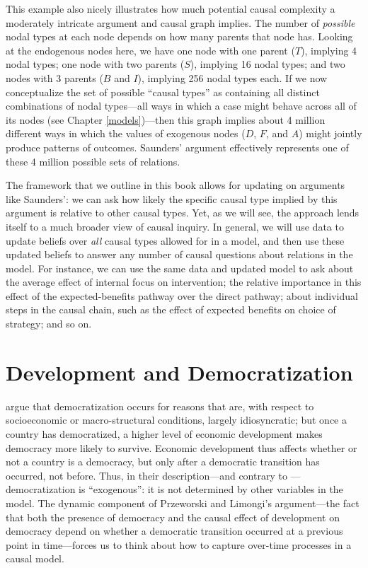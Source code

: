 \documentclass[
  12pt,
]{book}
\begin{document}
This example also nicely illustrates how much potential causal complexity a moderately intricate argument and causal graph implies. The number of \emph{possible} nodal types at each node depends on how many parents that node has. Looking at the endogenous nodes here, we have one node with one parent (\(T\)), implying 4 nodal types; one node with two parents (\(S\)), implying 16 nodal types; and two nodes with 3 parents (\(B\) and \(I\)), implying 256 nodal types each. If we now conceptualize the set of possible ``causal types'' as containing all distinct combinations of nodal types---all ways in which a case might behave across all of its nodes (see Chapter \ref{models})---then this graph implies about 4 million different ways in which the values of exogenous nodes (\(D\), \(F\), and \(A\)) might jointly produce patterns of outcomes. Saunders' argument effectively represents one of these 4 million possible sets of relations.

The framework that we outline in this book allows for updating on arguments like Saunders': we can ask how likely the specific causal type implied by this argument is relative to other causal types. Yet, as we will see, the approach lends itself to a much broader view of causal inquiry. In general, we will use data to update beliefs over \emph{all} causal types allowed for in a model, and then use these updated beliefs to answer any number of causal questions about relations in the model. For instance, we can use the same data and updated model to ask about the average effect of internal focus on intervention; the relative importance in this effect of the expected-benefits pathway over the direct pathway; about individual steps in the causal chain, such as the effect of expected benefits on choice of strategy; and so on.

\hypertarget{development-and-democratization}{%
\section{Development and Democratization}\label{development-and-democratization}}

\citet{przeworski1997modernization} argue that democratization occurs for reasons that are, with respect to socioeconomic or macro-structural conditions, largely idiosyncratic; but once a country has democratized, a higher level of economic development makes democracy more likely to survive. Economic development thus affects whether or not a country is a democracy, but only after a democratic transition has occurred, not before. Thus, in their description---and contrary to \citet{boix2003democracy} ---democratization is ``exogenous'': it is not determined by other variables in the model. The dynamic component of Przeworski and Limongi's argument---the fact that both the presence of democracy and the causal effect of development on democracy depend on whether a democratic transition occurred at a previous point in time---forces us to think about how to capture over-time processes in a causal model.
\end{document}

